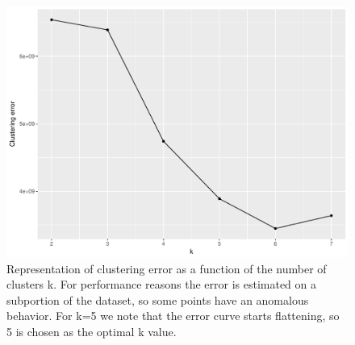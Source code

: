 \documentclass{acm_proc_article-sp-sigmod09}
\begin{document}
\begin{figure}
	\centering
	\includegraphics[width=1\columnwidth]{resources/clustered_plots/elbow.pdf}
	\caption{Representation of clustering error as a function of the number of clusters k. For performance reasons the error is estimated on a subportion of the dataset, so some points have an anomalous behavior. For k=5 we note that the error curve starts flattening, so 5 is chosen as the optimal k value.}
	\label{fig:elbow}
\end{figure}
\end{document}
